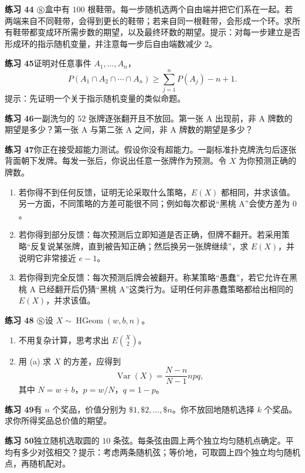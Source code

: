 \documentclass[UTF8,12pt,a4paper,fontset=fandol]{ctexart}
\begin{document}
\noindent\textbf{练习 44 $\circledS$}\quad 盒中有 $100$ 根鞋带。每一步随机选两个自由端并把它们系在一起。若两端来自不同鞋带，会得到更长的鞋带；若来自同一根鞋带，会形成一个环。求所有鞋带都变成环所需步数的期望，以及最终环数的期望。提示：对每一步建立是否形成环的指示随机变量，并注意每一步后自由端数减少 $2$。

\noindent\textbf{练习 45}\quad 证明对任意事件 $A_1,\ldots,A_n$，
\[
  P(A_1\cap A_2\cap\cdots\cap A_n)\ge \sum_{j=1}^n P(A_j)-n+1.
\]
提示：先证明一个关于指示随机变量的类似命题。

\noindent\textbf{练习 46}\quad 一副洗匀的 $52$ 张牌逐张翻开且不放回。第一张 A 出现前，非 A 牌数的期望是多少？第一张 A 与第二张 A 之间，非 A 牌数的期望是多少？

\noindent\textbf{练习 47}\quad 你正在接受超能力测试。假设你没有超能力。一副标准扑克牌洗匀后逐张背面朝下发牌。每发一张后，你说出任意一张牌作为预测。令 $X$ 为你预测正确的牌数。
\begin{enumerate}
  \item[(a)] 若你得不到任何反馈，证明无论采取什么策略，$E(X)$ 都相同，并求该值。另一方面，不同策略的方差可能很不同；例如每次都说“黑桃 A”会使方差为 $0$。
  \item[(b)] 若你得到部分反馈：每次预测后立即知道是否正确，但牌不翻开。若采用策略“反复说某张牌，直到被告知正确；然后换另一张牌继续”，求 $E(X)$，并说明它非常接近 $e-1$。
  \item[(c)] 若你得到完全反馈：每次预测后牌会被翻开。称某策略“愚蠢”，若它允许在黑桃 A 已经翻开后仍猜“黑桃 A”这类行为。证明任何非愚蠢策略都给出相同的 $E(X)$，并求该值。
\end{enumerate}

\noindent\textbf{练习 48 $\circledS$}\quad 设 $X\sim\operatorname{HGeom}(w,b,n)$。
\begin{enumerate}
  \item[(a)] 不用复杂计算，思考求出 $E\binom{X}{2}$。
  \item[(b)] 用 (a) 求 $X$ 的方差，应得到
  \[
    \operatorname{Var}(X)=\frac{N-n}{N-1}npq,
  \]
  其中 $N=w+b$，$p=w/N$，$q=1-p$。
\end{enumerate}

\noindent\textbf{练习 49}\quad 有 $n$ 个奖品，价值分别为 $\$1,\$2,\ldots,\$n$。你不放回地随机选择 $k$ 个奖品。求你所得奖品总价值的期望。

\noindent\textbf{练习 50}\quad 独立随机选取圆的 $10$ 条弦。每条弦由圆上两个独立均匀随机点确定。平均有多少对弦相交？提示：考虑两条随机弦；等价地，可取圆上四个独立均匀随机点，再随机配对。
\end{document}
